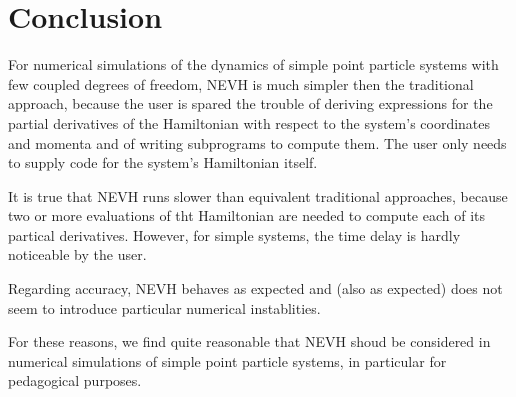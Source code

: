 \documentclass{iopart}
\begin{document}
\section{Conclusion}
For numerical simulations of the dynamics of simple point particle systems
with few coupled degrees of freedom, NEVH is much simpler then the traditional
approach, because the user is spared the trouble of deriving expressions for the
partial derivatives of the Hamiltonian with respect to the system's coordinates
and momenta and of writing subprograms to compute them. The user only needs to
supply code for the system's Hamiltonian itself.

It is true that NEVH runs
slower than equivalent traditional approaches, because two or more evaluations
of tht Hamiltonian are needed to compute each of its partical derivatives. 
However, for simple systems, the time delay is hardly noticeable by the user.

Regarding accuracy, NEVH behaves as expected and (also as expected) does not
seem to introduce particular numerical instablities.

For these reasons, we find quite reasonable that NEVH shoud be considered in
numerical simulations of simple point particle systems, in particular for
pedagogical purposes.


\end{document}

